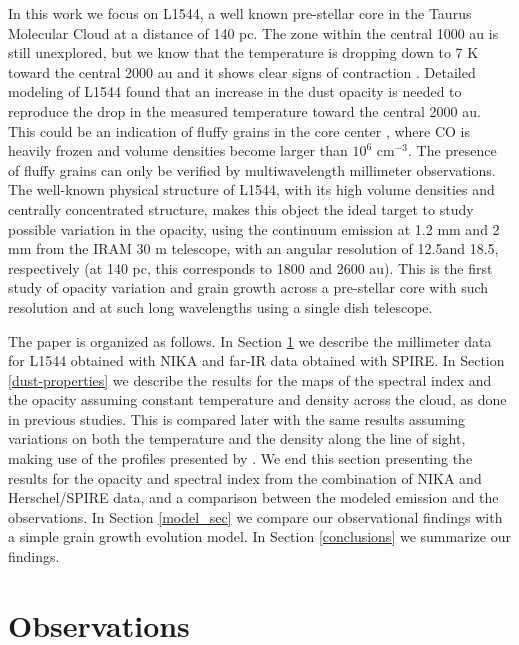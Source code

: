 \documentclass{aa}
\begin{document}
In this work we focus on L1544, a well known pre-stellar core in the Taurus Molecular Cloud at a distance of 140 pc. The zone within the central 1000 au is still unexplored, but we know that the temperature is dropping down to 7 K toward the central 2000 au  and it shows clear signs of contraction . Detailed modeling of L1544  found that an increase in the dust opacity is needed to reproduce the drop in the measured temperature toward the central 2000 au. This could be an indication of fluffy grains in the core center , where CO is heavily frozen  and volume densities become larger than $10^{6}$ cm$^{-3}$. The presence of fluffy grains can only be verified by multiwavelength millimeter observations. The well-known physical structure of L1544, with its high volume densities and centrally concentrated structure, makes this object the ideal target to study possible variation in the opacity, using the continuum emission at 1.2 mm and 2 mm from the IRAM 30 m telescope, with an angular resolution of 12.5\arcsec and 18.5\arcsec, respectively (at 140 pc, this corresponds to 1800 and 2600 au). This is the first study of opacity variation and grain growth across a pre-stellar core with such resolution and at such long wavelengths using a single dish telescope. 

The paper is organized as follows. In Section \ref{Observations} we describe the millimeter data for L1544 obtained with NIKA and far-IR data obtained with SPIRE. In Section \ref{dust-properties} we describe the results for the maps of the spectral index and the opacity assuming constant temperature and density across the cloud, as done in previous studies. This is compared later with the same results assuming variations on both the temperature and the density along the line of sight, making use of the profiles presented by . We end this section presenting the results for the opacity and spectral index from the combination of NIKA and Herschel/SPIRE data, and a comparison between the modeled emission and the observations. In Section \ref{model_sec} we compare our observational findings with a simple grain growth evolution model. In Section \ref{conclusions} we summarize our findings.



\section{Observations} \label{Observations}
\end{document}
